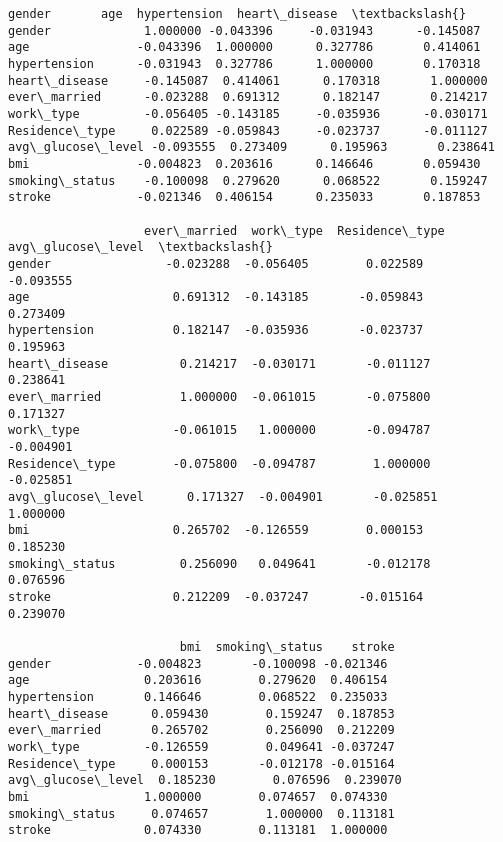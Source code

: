 \documentclass[11pt]{article}
\begin{document}
    \begin{Verbatim}[commandchars=\\\{\}]
                     gender       age  hypertension  heart\_disease  \textbackslash{}
gender             1.000000 -0.043396     -0.031943      -0.145087
age               -0.043396  1.000000      0.327786       0.414061
hypertension      -0.031943  0.327786      1.000000       0.170318
heart\_disease     -0.145087  0.414061      0.170318       1.000000
ever\_married      -0.023288  0.691312      0.182147       0.214217
work\_type         -0.056405 -0.143185     -0.035936      -0.030171
Residence\_type     0.022589 -0.059843     -0.023737      -0.011127
avg\_glucose\_level -0.093555  0.273409      0.195963       0.238641
bmi               -0.004823  0.203616      0.146646       0.059430
smoking\_status    -0.100098  0.279620      0.068522       0.159247
stroke            -0.021346  0.406154      0.235033       0.187853

                   ever\_married  work\_type  Residence\_type  avg\_glucose\_level  \textbackslash{}
gender                -0.023288  -0.056405        0.022589          -0.093555
age                    0.691312  -0.143185       -0.059843           0.273409
hypertension           0.182147  -0.035936       -0.023737           0.195963
heart\_disease          0.214217  -0.030171       -0.011127           0.238641
ever\_married           1.000000  -0.061015       -0.075800           0.171327
work\_type             -0.061015   1.000000       -0.094787          -0.004901
Residence\_type        -0.075800  -0.094787        1.000000          -0.025851
avg\_glucose\_level      0.171327  -0.004901       -0.025851           1.000000
bmi                    0.265702  -0.126559        0.000153           0.185230
smoking\_status         0.256090   0.049641       -0.012178           0.076596
stroke                 0.212209  -0.037247       -0.015164           0.239070

                        bmi  smoking\_status    stroke
gender            -0.004823       -0.100098 -0.021346
age                0.203616        0.279620  0.406154
hypertension       0.146646        0.068522  0.235033
heart\_disease      0.059430        0.159247  0.187853
ever\_married       0.265702        0.256090  0.212209
work\_type         -0.126559        0.049641 -0.037247
Residence\_type     0.000153       -0.012178 -0.015164
avg\_glucose\_level  0.185230        0.076596  0.239070
bmi                1.000000        0.074657  0.074330
smoking\_status     0.074657        1.000000  0.113181
stroke             0.074330        0.113181  1.000000
    \end{Verbatim}
\end{document}

